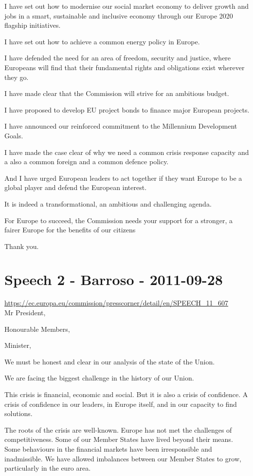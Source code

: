 \documentclass[a4paper,11pt]{article}
\begin{document}
I have set out how to modernise our social market economy to deliver growth and jobs in a smart, sustainable and inclusive economy through our Europe 2020 flagship initiatives.

I have set out how to achieve a common energy policy in Europe.

I have defended the need for an area of freedom, security and justice, where Europeans will find that their fundamental rights and obligations exist wherever they go.

I have made clear that the Commission will strive for an ambitious budget.

I have proposed to develop EU project bonds to finance major European projects.

I have announced our reinforced commitment to the Millennium Development Goals.

I have made the case clear of why we need a common crisis response capacity and a also a common foreign and a common defence policy.

And I have urged European leaders to act together if they want Europe to be a global player and defend the European interest.

It is indeed a transformational, an ambitious and challenging agenda.

For Europe to succeed, the Commission needs your support for a stronger, a fairer Europe for the benefits of our citizens

Thank you.
 \newpage\section{Speech 2 - Barroso - 2011-09-28}
\url{https://ec.europa.eu/commission/presscorner/detail/en/SPEECH_11_607}\\[3mm]
Mr President,

Honourable Members,

Minister,

We must be honest and clear in our analysis of the state of the Union.

We are facing the biggest challenge in the history of our Union.

This crisis is financial, economic and social. But it is also a crisis of confidence. A crisis of confidence in our leaders, in Europe itself, and in our capacity to find solutions.

The roots of the crisis are well-known. Europe has not met the challenges of competitiveness. Some of our Member States have lived beyond their means. Some behaviours in the financial markets have been irresponsible and inadmissible. We have allowed imbalances between our Member States to grow, particularly in the euro area.
\end{document}
